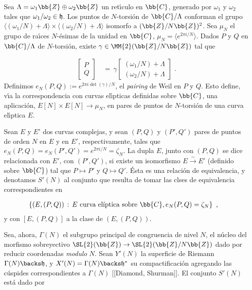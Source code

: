 Sea $\Lambda=\omega_{1}\bb{Z}\oplus\omega_{2}\bb{Z}$ un ret\'{\i}culo en $\bb{C}$,
generado por $\omega_{1}$ y $\omega_{2}$ tales que
$\omega_{1}/\omega_{2}\in\frak{h}$. Los puntos de $N$-torsi\'{o}n de
$\bb{C}/\Lambda$ conforman el grupo
\begin{math}
\langle(\omega_{1}/N)+\Lambda\rangle\times
\langle(\omega_{2}/N)+\Lambda\rangle
\end{math}
isomorfo a $(\bb{Z}/N\bb{Z})^{2}$. Sea $\mu_{N}$ el grupo de ra\'{\i}ces
$N$-\'{e}simas de la unidad en $\bb{C}$, $\mu_{N}=\langle e^{2\pi i/N}\rangle$.
Dados $P$ y $Q$ en $\bb{C}/\Lambda$ de $N$-torsi\'{o}n, existe
$\gamma\in\MM{2}(\bb{Z}/N\bb{Z})$ tal que

\begin{align*}
\begin{bmatrix}
P\\Q
\end{bmatrix} & \,=\,\gamma
\begin{bmatrix}
(\omega_{1}/N)+\Lambda\\(\omega_{2}/N)+\Lambda
\end{bmatrix}\text{ .}
\end{align*}
Definimos $e_{N}(P,Q):=e^{2\pi i\det(\gamma)/N}$, el \textit{pairing} de Weil en
$P$ y $Q$. Esto define, v\'{\i}a la correspondencia con curvas el\'{\i}pticas
definidas sobre $\bb{C}$, una aplicaci\'{o}n,
$E[N]\times E[N]\rightarrow\mu_{N}$, en pares de puntos de $N$-torsi\'{o}n de una
curva el\'{\i}ptica $E$.

Sean $E$ y $E'$ dos curvas complejas, y sean $(P,Q)$ y $(P',Q')$ pares de puntos de
orden $N$ en $E$ y en $E'$, respectivamente, tales que
$e_{N}(P,Q)=e_{N}(P',Q')=e^{2\pi i/N}=\zeta_{N}$. La dupla $E$, junto con $(P,Q)$
se dice relacionada con $E'$, con $(P',Q')$, si existe un isomorfismo
$E\xrightarrow{\sim}E'$ (definido sobre $\bb{C}$) tal que $P\mapsto P'$ y
$Q\mapsto Q'$. \'{E}sta es una relaci\'{o}n de equivalencia, y denotamos $S'(N)$
al conjunto que resulta de tomar las clses de equivalencia correspondientes en

\begin{align*}
& \left\lbrace (E,(P,Q))\,:\,E\text{ curva el\'{\i}ptica sobre }\bb{C},
e_{N}(P,Q)=\zeta_{N}\right\rbrace\text{ ,}
\end{align*}
y con $[E,(P,Q)]$ a la clase de $(E,(P,Q))$.

Sea, ahora, $\Gamma(N)$ el subgrupo principal de congruencia de nivel $N$, el
n\'{u}cleo del morfismo sobreyectivo
$\SL{2}(\bb{Z})\rightarrow\SL{2}(\bb{Z}/N\bb{Z})$ dado por reducir coordenadas
\textit{modulo} $N$. Sean $Y'(N)$ la superficie de Riemann
$\Gamma(N)\backs\frak{h}$, y $X'(N)=\Gamma(N)\backs\frak{h}^{*}$ su
compactificaci\'{o}n agregando las c\'{u}spides correspondientes a $\Gamma(N)$
[[Diamond, Shurman]]. El conjunto $S'(N)$ est\'{a} dado por

